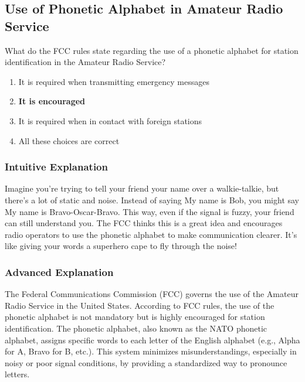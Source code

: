 \subsection{Use of Phonetic Alphabet in Amateur Radio Service}
\label{T1A03}

\begin{tcolorbox}[colback=gray!10!white,colframe=black!75!black,title=T1A03]
What do the FCC rules state regarding the use of a phonetic alphabet for station identification in the Amateur Radio Service?
\begin{enumerate}[label=\Alph*)]
    \item It is required when transmitting emergency messages
    \item \textbf{It is encouraged}
    \item It is required when in contact with foreign stations
    \item All these choices are correct
\end{enumerate}
\end{tcolorbox}

\subsubsection{Intuitive Explanation}
Imagine you're trying to tell your friend your name over a walkie-talkie, but there's a lot of static and noise. Instead of saying My name is Bob, you might say My name is Bravo-Oscar-Bravo. This way, even if the signal is fuzzy, your friend can still understand you. The FCC thinks this is a great idea and encourages radio operators to use the phonetic alphabet to make communication clearer. It's like giving your words a superhero cape to fly through the noise!

\subsubsection{Advanced Explanation}
The Federal Communications Commission (FCC) governs the use of the Amateur Radio Service in the United States. According to FCC rules, the use of the phonetic alphabet is not mandatory but is highly encouraged for station identification. The phonetic alphabet, also known as the NATO phonetic alphabet, assigns specific words to each letter of the English alphabet (e.g., Alpha for A, Bravo for B, etc.). This system minimizes misunderstandings, especially in noisy or poor signal conditions, by providing a standardized way to pronounce letters.

